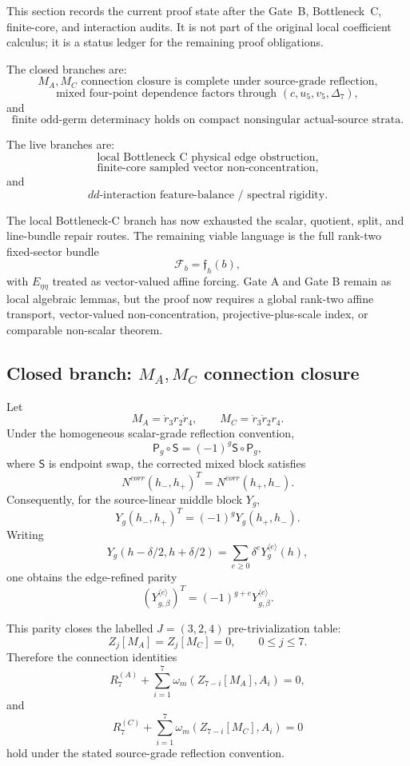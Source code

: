 \documentclass[11pt,a4paper]{amsart}
\def\corr{corr}%
\theoremstyle{plain}
\theoremstyle{definition}
\newcommand{\corr}{\mathrm{corr}}
\begin{document}
This section records the current proof state after the Gate~B, Bottleneck~C,
finite-core, and interaction audits.  It is not part of the original local
coefficient calculus; it is a status ledger for the remaining proof
obligations.

The closed branches are:
\[
\boxed{
M_A,M_C\text{ connection closure is complete under source-grade reflection,}
}
\]
\[
\boxed{
\text{mixed four-point dependence factors through }
(c,u_5,v_5,\Delta_7),
}
\]
and
\[
\boxed{
\text{finite odd-germ determinacy holds on compact nonsingular
actual-source strata.}
}
\]

The live branches are:
\[
\boxed{
\text{local Bottleneck~C physical edge obstruction,}
}
\]
\[
\boxed{
\text{finite-core sampled vector non-concentration,}
}
\]
and
\[
\boxed{
dd\text{-interaction feature-balance / spectral rigidity.}
}
\]

The local Bottleneck-C branch has now exhausted the scalar, quotient, split,
and line-bundle repair routes.  The remaining viable language is the full
rank-two fixed-sector bundle
\[
\mathcal F_b=\mathfrak f_h(b),
\]
with \(E_{\eta\eta}\) treated as vector-valued affine forcing.  Gate A and
Gate B remain as local algebraic lemmas, but the proof now requires a global
rank-two affine transport, vector-valued non-concentration, projective-plus-scale
index, or comparable non-scalar theorem.

\subsection{Closed branch: \(M_A,M_C\) connection closure}
\label{subsec:closed-ma-mc-connection-closure}

Let
\[
M_A=\dot r_3r_2\dot r_4,
\qquad
M_C=\dot r_3\dot r_2r_4.
\]
Under the homogeneous scalar-grade reflection convention,
\[
\mathsf P_g\circ\mathsf S=(-1)^g\mathsf S\circ\mathsf P_g,
\]
where \(\mathsf S\) is endpoint swap, the corrected mixed block satisfies
\[
N^{\corr}(h_-,h_+)^T=N^{\corr}(h_+,h_-).
\]
Consequently, for the source-linear middle block \(Y_g\),
\[
Y_g(h_-,h_+)^T=(-1)^gY_g(h_+,h_-).
\]
Writing
\[
Y_g(h-\delta/2,h+\delta/2)
=
\sum_{e\ge0}\delta^eY_g^{\langle e\rangle}(h),
\]
one obtains the edge-refined parity
\[
\left(Y_{g,\beta}^{\langle e\rangle}\right)^T
=
(-1)^{g+e}Y_{g,\beta}^{\langle e\rangle}.
\]

This parity closes the labelled \(J=(3,2,4)\) pre-trivialization table:
\[
Z_j[M_A]=Z_j[M_C]=0,
\qquad
0\le j\le7.
\]
Therefore the connection identities
\[
R_7^{(A)}
+
\sum_{i=1}^{7}\omega_m(Z_{7-i}[M_A],A_i)=0,
\]
and
\[
R_7^{(C)}
+
\sum_{i=1}^{7}\omega_m(Z_{7-i}[M_C],A_i)=0
\]
hold under the stated source-grade reflection convention.
\end{document}

